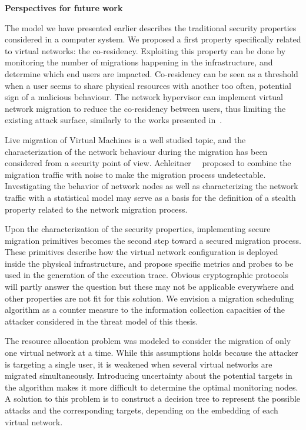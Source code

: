 \textbf{Perspectives for future work\\}

The model we have presented earlier describes the traditional security properties considered in a computer system. We proposed a first property specifically related to virtual networks: the co-residency. Exploiting this property can be done by monitoring the number of migrations happening in the infrastructure, and determine which end users are impacted. Co-residency can be seen as a threshold when a user seems to share physical resources with another too often, potential sign of a malicious behaviour.
The network hypervisor can implement virtual network migration to reduce the co-residency between users, thus limiting the existing attack surface, similarly to the works presented in~\cite{nomad-Moon2015b,malicious-atya2017}.

Live migration of Virtual Machines is a well studied topic, and the characterization of the network behaviour during the migration has been considered from a security point of view.
Achleitner~\etal~\cite{stealth-Achleitner2017a} proposed to combine the migration traffic with noise to make the migration process undetectable. Investigating the behavior of network nodes as well as characterizing the network traffic with a statistical model may serve as a basis for the definition of a stealth property related to the network migration process. 

Upon the characterization of the security properties, implementing secure migration primitives becomes the second step toward a secured migration process. These primitives describe how the virtual network configuration is deployed inside the physical infrastructure, and propose specific metrics and probes to be used in the generation of the execution trace. Obvious cryptographic protocols will partly answer the question but these may not be applicable everywhere and other properties are not fit for this solution. We envision a migration scheduling algorithm as a counter measure to the information collection capacities of the attacker considered in the threat model of this thesis.

The resource allocation problem was modeled to consider the migration of only one virtual network at a time. While this assumptions holds because the attacker is targeting a single user, it is weakened when several virtual networks are migrated simultaneously. Introducing uncertainty about the potential targets in the algorithm makes it more difficult to determine the optimal monitoring nodes. A solution to this problem is to construct a decision tree to represent the possible attacks and the corresponding targets, depending on the embedding of each virtual network.

